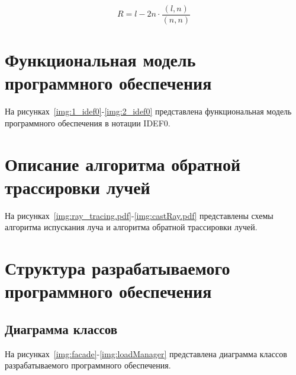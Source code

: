 \begin{equation}
	\label{reflect_ray}
	R = l - 2 n \cdot \frac{(l, n)}{(n, n)}
\end{equation}

\clearpage
\section{Функциональная модель программного обеспечения}
На рисунках~\ref{img:1_idef0}-\ref{img:2_idef0} представлена функциональная модель программного обеспечения в нотации IDEF0.

\FloatBarrier
{}
\FloatBarrier
{}
\FloatBarrier

\clearpage
\section{Описание алгоритма обратной трассировки лучей}
На рисунках~\ref{img:ray_tracing.pdf}-\ref{img:castRay.pdf} представлены схемы алгоритма испускания луча и алгоритма обратной трассировки лучей.
\FloatBarrier
{}
\FloatBarrier
{}
\FloatBarrier


\clearpage
\section{Структура разрабатываемого программного обеспечения}
\subsection{Диаграмма классов}
На рисунках~\ref{img:facade}-\ref{img:loadManager} представлена диаграмма классов разрабатываемого программного обеспечения.
\FloatBarrier
{}
\FloatBarrier
{}
\FloatBarrier
{}
\FloatBarrier


